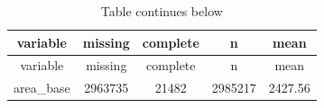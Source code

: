 \documentclass[]{book}
\theoremstyle{definition}
\theoremstyle{definition}
\theoremstyle{definition}
\theoremstyle{remark}
\begin{document}
\begin{longtable}[]{@{}ccccc@{}}
\caption{Table continues below}\tabularnewline
\toprule
\begin{minipage}[b]{0.35\columnwidth}\centering\strut
variable\strut
\end{minipage} & \begin{minipage}[b]{0.12\columnwidth}\centering\strut
missing\strut
\end{minipage} & \begin{minipage}[b]{0.13\columnwidth}\centering\strut
complete\strut
\end{minipage} & \begin{minipage}[b]{0.12\columnwidth}\centering\strut
n\strut
\end{minipage} & \begin{minipage}[b]{0.12\columnwidth}\centering\strut
mean\strut
\end{minipage}\tabularnewline
\midrule
\endfirsthead
\toprule
\begin{minipage}[b]{0.35\columnwidth}\centering\strut
variable\strut
\end{minipage} & \begin{minipage}[b]{0.12\columnwidth}\centering\strut
missing\strut
\end{minipage} & \begin{minipage}[b]{0.13\columnwidth}\centering\strut
complete\strut
\end{minipage} & \begin{minipage}[b]{0.12\columnwidth}\centering\strut
n\strut
\end{minipage} & \begin{minipage}[b]{0.12\columnwidth}\centering\strut
mean\strut
\end{minipage}\tabularnewline
\midrule
\endhead
\begin{minipage}[t]{0.35\columnwidth}\centering\strut
area\_base\strut
\end{minipage} & \begin{minipage}[t]{0.12\columnwidth}\centering\strut
2963735\strut
\end{minipage} & \begin{minipage}[t]{0.13\columnwidth}\centering\strut
21482\strut
\end{minipage} & \begin{minipage}[t]{0.12\columnwidth}\centering\strut
2985217\strut
\end{minipage} & \begin{minipage}[t]{0.12\columnwidth}\centering\strut
2427.56\strut

\end{minipage}
\end{longtable}
\end{document}
